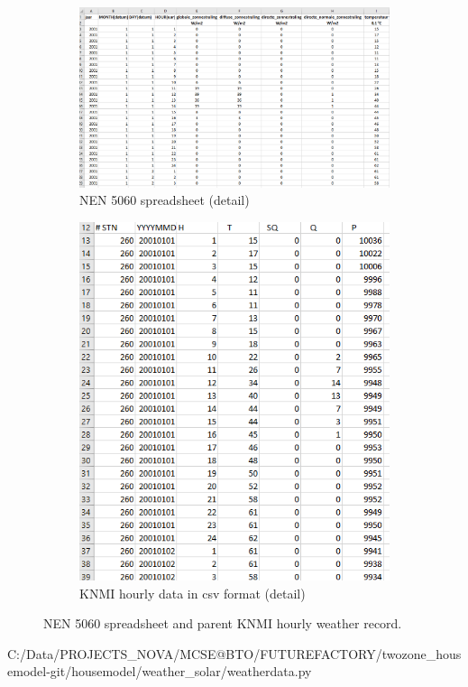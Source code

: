 \begin{figure}[H]
	\begin{subfigure}{.7\textwidth}
		\centering
		\includegraphics[width=.8\linewidth]{Pictures/NEN5060.png}  
		\caption{NEN 5060 spreadsheet (detail)}
		\label{fig:nen5060}
	\end{subfigure}
	\begin{subfigure}{.3\textwidth}
		\centering
		\includegraphics[width=.8\linewidth]{Pictures/KNMI.png}  
		\caption{KNMI hourly data in csv format (detail)}
		\label{fig:knmi}
	\end{subfigure}
	\caption{NEN 5060 spreadsheet and parent KNMI hourly weather record.}
	\label{fig:fig}
\end{figure}


 
{C:/Data/PROJECTS_NOVA/MCSE@BTO/FUTUREFACTORY/twozone_housemodel-git/housemodel/weather_solar/weatherdata.py}

